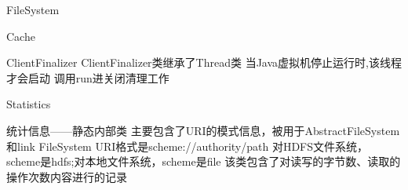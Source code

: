 \begin{XeClass}{FileSystem}
\begin{XeInnerClass}{Cache}
\begin{XeInnerClass}{ClientFinalizer}
 ClientFinalizer类继承了Thread类
 当Java虚拟机停止运行时,该线程才会启动
 调用run进关闭清理工作

    \end{XeInnerClass}
  \end{XeInnerClass}
  \begin{XeInnerClass}{Statistics}
     
 统计信息——静态内部类
 主要包含了URI的模式信息，被用于AbstractFileSystem和link FileSystem
 URI格式是scheme://authority/path
 对HDFS文件系统，scheme是hdfs;对本地文件系统，scheme是file
 该类包含了对读写的字节数、读取的操作次数内容进行的记录

  \end{XeInnerClass}
\end{XeClass}
